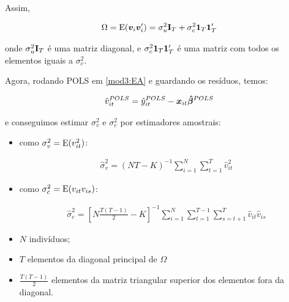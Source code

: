 \documentclass[11pt, oneside, a4paper, article]{article}
\numberwithin{equation}{section}
\begin{document}
\begin{description}
Assim, 

\vspace{-1 em}
\begin{align*}
\Omega 
= 
\text{E}(\boldsymbol{v}_{i} \boldsymbol{v}_{i}') = \sigma^{2}_{u} \mathbf{I}_{T} + \sigma_{c}^{2} \boldsymbol{1}_{T} \boldsymbol{1}_{T}'
\end{align*}

\noindent
onde
$\sigma^{2}_{u} \mathbf{I}_{T}$ 
é uma matriz diagonal, e 
$\sigma_{c}^{2} \boldsymbol{1}_{T} \boldsymbol{1}_{T}'$ é uma matriz com todos os elementos iguais a $\sigma_{c}^{2}$.

Agora, rodando POLS em \eqref{mod3:EA} e guardando os resíduos, temos:

\vspace{-1 em}
\begin{align*}
\hat{v}_{it}^{POLS}
= 
\hat{y}_{it}^{POLS} - \boldsymbol{x}_{it} \boldsymbol{\hat{\beta}}^{POLS}
\end{align*}

\noindent
e conseguimos estimar $\sigma_{v}^{2}$ e $\sigma_{c}^{2}$ por estimadores amostrais:

\begin{itemize}\itemsep0pt
\item 
como $\sigma_{v}^{2} = \text{E}(v_{it}^{2})$:

\vspace{-1.5 em}
\begin{align*}
\hat{\sigma}_{v}^{2} =
(NT - K)^{-1} 
\sum_{i=1}^{N}
\sum_{t=1}^{T}
\hat{v}_{it}^2
\end{align*}
\vspace{-1.5 em}

\item 
como $\sigma_{c}^{2} = \text{E}(v_{it} v_{is})$:

\vspace{-1.5 em}
\begin{align*}
\hat{\sigma}_{c}^{2} =
\left[ N \frac{T ( T-1 )}{2} - K  \right]^{-1}
\sum_{i=1}^{N}
\sum_{t=1}^{T-1}
\sum_{s=t+1}^{T}
\hat{v}_{it} \hat{v}_{is}
\end{align*}
\vspace{-1.5 em}

\item $N$ indivíduos;

\item $T$ elementos da diagonal principal de $\Omega$

\item $\frac{T ( T - 1)}{2}$ elementos da matriz triangular superior dos elementos fora da diagonal.


\end{itemize}
\end{description}
\end{document}

